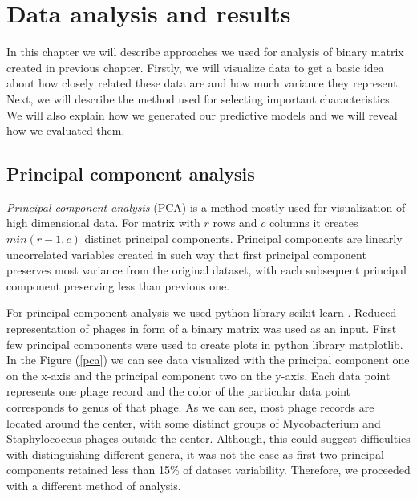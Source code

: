 \chapter{Data analysis and results}
In this chapter we will describe approaches we used for analysis of binary matrix created in previous chapter.
Firstly, we will visualize data to get a basic idea about how closely related these data are and how much variance they represent.
Next, we will describe the method used for selecting important characteristics.
We will also explain how we generated our predictive models and we will reveal how we evaluated them.

\section{Principal component analysis}
\emph{Principal component analysis} (PCA) is a method mostly used for visualization of high dimensional data.
For matrix with $r$ rows and $c$ columns it creates $min(r-1, c)$ distinct principal components.
Principal components are linearly uncorrelated variables created in such way that first principal component preserves most variance from the original dataset, with each subsequent principal component preserving less than previous one.

For principal component analysis we used python library scikit-learn \cite{sklearn}.
Reduced representation of phages in form of a binary matrix was used as an input.
First few principal components were used to create plots in python library matplotlib.
In the Figure (\ref{pca}) we can see data visualized with the principal component one on the x-axis and the principal component two on the y-axis.
Each data point represents one phage record and the color of the particular data point corresponds to genus of that phage.
As we can see, most phage records are located around the center, with some distinct groups of Mycobacterium and Staphylococcus phages outside the center.
Although, this could suggest difficulties with distinguishing different genera, it was not the case as first two principal components retained less than 15\% of dataset variability.
Therefore, we proceeded with a different method of analysis.

